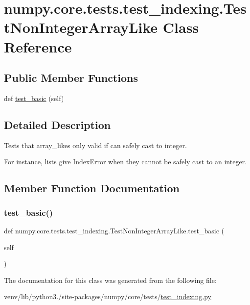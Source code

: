 \hypertarget{classnumpy_1_1core_1_1tests_1_1test__indexing_1_1TestNonIntegerArrayLike}{}\section{numpy.\+core.\+tests.\+test\+\_\+indexing.\+Test\+Non\+Integer\+Array\+Like Class Reference}
\label{classnumpy_1_1core_1_1tests_1_1test__indexing_1_1TestNonIntegerArrayLike}
\subsection*{Public Member Functions}
\begin{DoxyCompactItemize}
\item 
def \hyperlink{classnumpy_1_1core_1_1tests_1_1test__indexing_1_1TestNonIntegerArrayLike_ae389237251c5475a7f637b15e1a24e97}{test\+\_\+basic} (self)
\end{DoxyCompactItemize}


\subsection{Detailed Description}
\begin{DoxyVerb}Tests that array_likes only valid if can safely cast to integer.

For instance, lists give IndexError when they cannot be safely cast to
an integer.\end{DoxyVerb}
 

\subsection{Member Function Documentation}
\mbox{\label{classnumpy_1_1core_1_1tests_1_1test__indexing_1_1TestNonIntegerArrayLike_ae389237251c5475a7f637b15e1a24e97}} 
\subsubsection{\texorpdfstring{test\+\_\+basic()}{test\_basic()}}
{\footnotesize\ttfamily def numpy.\+core.\+tests.\+test\+\_\+indexing.\+Test\+Non\+Integer\+Array\+Like.\+test\+\_\+basic (\begin{DoxyParamCaption}\item[{}]{self }\end{DoxyParamCaption})}



The documentation for this class was generated from the following file\+:\begin{DoxyCompactItemize}
\item 
venv/lib/python3./site-\/packages/numpy/core/tests/\hyperlink{test__indexing_8py}{test\+\_\+indexing.\+py}\end{DoxyCompactItemize}
